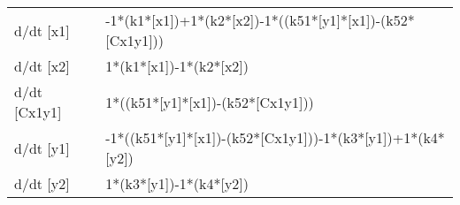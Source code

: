 \documentclass[10pt,a4paper]{article}
\begin{document}
\begin{table}[ht]
\centering
\begin{tabular}{ll}
  \hline
  \hline
d/dt [x1] &  -1*(k1*[x1])+1*(k2*[x2])-1*((k51*[y1]*[x1])-(k52*[Cx1y1]))  \\ 
  d/dt [x2] &  1*(k1*[x1])-1*(k2*[x2])  \\ 
  d/dt [Cx1y1] &  1*((k51*[y1]*[x1])-(k52*[Cx1y1]))  \\ 
  d/dt [y1] &  -1*((k51*[y1]*[x1])-(k52*[Cx1y1]))-1*(k3*[y1])+1*(k4*[y2])  \\ 
  d/dt [y2] &  1*(k3*[y1])-1*(k4*[y2])  \\ 
   \hline
\end{tabular}
\end{table}
 
\end{document}
